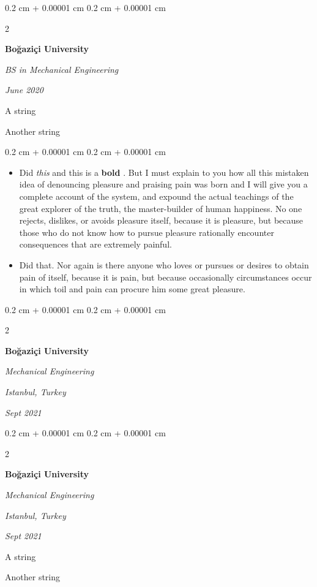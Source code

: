 \documentclass[10pt, letterpaper]{article}
\newenvironment{summary}{
    \begin{description}[
        topsep=0.10 cm,
        parsep=0.10 cm,
        partopsep=0pt,
        itemsep=0pt,
        leftmargin=0.4 cm + 10pt
    ]
}{
    \end{description}
} %
\newenvironment{highlights}{
    \begin{itemize}[
        topsep=0.10 cm,
        parsep=0.10 cm,
        partopsep=0pt,
        itemsep=0pt,
        leftmargin=0.4 cm + 10pt
    ]
}{
    \end{itemize}
} %
\newenvironment{onecolentry}{
    \begin{adjustwidth}{
        0.2 cm + 0.00001 cm
    }{
        0.2 cm + 0.00001 cm
    }
}{
    \end{adjustwidth}
} %
\newenvironment{twocolentry}[2][]{
    \onecolentry
    \def\secondColumn{#2}
    \setcolumnwidth{\fill, 4.5 cm}
    \begin{paracol}{2}
}{
    \switchcolumn \raggedleft \secondColumn
    \end{paracol}
    \endonecolentry
} %
\let\hrefWithoutArrow\href
\renewcommand{\href}[2]{\hrefWithoutArrow{#1}{\ifthenelse{\equal{#2}{}}{ }{#2 }\raisebox{.15ex}{\footnotesize \faExternalLink*}}}
\begin{document}
        \begin{twocolentry}{
            
            
        \textit{June 2020}}
            \textbf{Boğaziçi University}

            \textit{BS in Mechanical Engineering}
        \end{twocolentry}
            \begin{summary}
                \item A string
                \item Another string
            \end{summary}
        \vspace{0.10 cm}
        \begin{onecolentry}
            \begin{highlights}
                \item Did \textit{this} and this is a \textbf{bold} \href{https://example.com}{link}. But I must explain to you how all this mistaken idea of denouncing pleasure and praising pain was born and I will give you a complete account of the system, and expound the actual teachings of the great explorer of the truth, the master-builder of human happiness. No one rejects, dislikes, or avoids pleasure itself, because it is pleasure, but because those who do not know how to pursue pleasure rationally encounter consequences that are extremely painful.
                \item Did that. Nor again is there anyone who loves or pursues or desires to obtain pain of itself, because it is pain, but because occasionally circumstances occur in which toil and pain can procure him some great pleasure.
            \end{highlights}
        \end{onecolentry}


        \vspace{0.2 cm}

        \begin{twocolentry}{
        \textit{Istanbul, Turkey}    
            
        \textit{Sept 2021}}
            \textbf{Boğaziçi University}

            \textit{Mechanical Engineering}
        \end{twocolentry}


        \vspace{0.2 cm}

        \begin{twocolentry}{
        \textit{Istanbul, Turkey}    
            
        \textit{Sept 2021}}
            \textbf{Boğaziçi University}

            \textit{Mechanical Engineering}
        \end{twocolentry}
            \begin{summary}
                \item A string
                \item Another string
            \end{summary}
\end{document}
